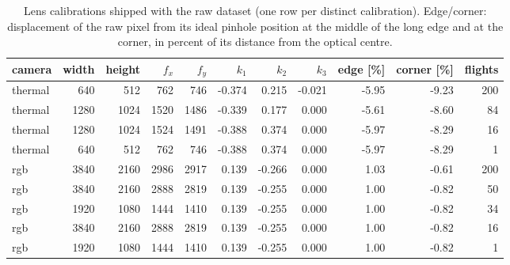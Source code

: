 \begin{table}[t]
\centering
\small
\caption{Lens calibrations shipped with the raw dataset (one row per distinct calibration). Edge/corner: displacement of the raw pixel from its ideal pinhole position at the middle of the long edge and at the corner, in percent of its distance from the optical centre.}
\label{tab:calib}
\begin{tabular}{lrrrrrrrrrr}
\toprule
camera & width & height & $f_x$ & $f_y$ & $k_1$ & $k_2$ & $k_3$ & edge [\%] & corner [\%] & flights \\
\midrule
thermal & 640 & 512 & 762 & 746 & -0.374 & 0.215 & -0.021 & -5.95 & -9.23 & 200 \\
thermal & 1280 & 1024 & 1520 & 1486 & -0.339 & 0.177 & 0.000 & -5.61 & -8.60 & 84 \\
thermal & 1280 & 1024 & 1524 & 1491 & -0.388 & 0.374 & 0.000 & -5.97 & -8.29 & 16 \\
thermal & 640 & 512 & 762 & 746 & -0.388 & 0.374 & 0.000 & -5.97 & -8.29 & 1 \\
rgb & 3840 & 2160 & 2986 & 2917 & 0.139 & -0.266 & 0.000 & 1.03 & -0.61 & 200 \\
rgb & 3840 & 2160 & 2888 & 2819 & 0.139 & -0.255 & 0.000 & 1.00 & -0.82 & 50 \\
rgb & 1920 & 1080 & 1444 & 1410 & 0.139 & -0.255 & 0.000 & 1.00 & -0.82 & 34 \\
rgb & 3840 & 2160 & 2888 & 2819 & 0.139 & -0.255 & 0.000 & 1.00 & -0.82 & 16 \\
rgb & 1920 & 1080 & 1444 & 1410 & 0.139 & -0.255 & 0.000 & 1.00 & -0.82 & 1 \\
\bottomrule
\end{tabular}
\end{table}
